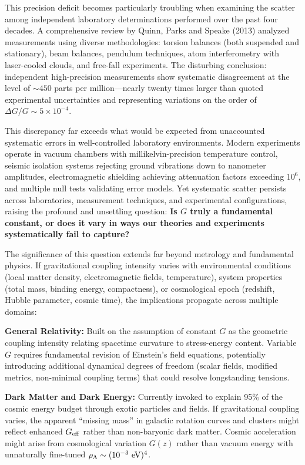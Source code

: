 \documentclass[11pt,a4paper]{article}
\begin{document}
This precision deficit becomes particularly troubling when examining the
scatter among independent laboratory determinations performed over the
past four decades. A comprehensive review by Quinn, Parks and Speake
(2013) analyzed measurements using diverse methodologies: torsion
balances (both suspended and stationary), beam balances, pendulum
techniques, atom interferometry with laser-cooled clouds, and free-fall
experiments. The disturbing conclusion: independent high-precision
measurements show systematic disagreement at the level of \(\sim 450\)
parts per million---nearly twenty times larger than quoted experimental
uncertainties and representing variations on the order of
\(\Delta G/G \sim 5 \times 10^{-4}\).

This discrepancy far exceeds what would be expected from unaccounted
systematic errors in well-controlled laboratory environments. Modern
experiments operate in vacuum chambers with millikelvin-precision
temperature control, seismic isolation systems rejecting ground
vibrations down to nanometer amplitudes, electromagnetic shielding
achieving attenuation factors exceeding \(10^6\), and multiple null
tests validating error models. Yet systematic scatter persists across
laboratories, measurement techniques, and experimental configurations,
raising the profound and unsettling question: \textbf{Is \(G\) truly a
fundamental constant, or does it vary in ways our theories and
experiments systematically fail to capture?}

The significance of this question extends far beyond metrology and
fundamental physics. If gravitational coupling intensity varies with
environmental conditions (local matter density, electromagnetic fields,
temperature), system properties (total mass, binding energy,
compactness), or cosmological epoch (redshift, Hubble parameter, cosmic
time), the implications propagate across multiple domains:

\textbf{General Relativity:} Built on the assumption of constant \(G\)
as the geometric coupling intensity relating spacetime curvature to
stress-energy content. Variable \(G\) requires fundamental revision of
Einstein's field equations, potentially introducing additional dynamical
degrees of freedom (scalar fields, modified metrics, non-minimal
coupling terms) that could resolve longstanding tensions.

\textbf{Dark Matter and Dark Energy:} Currently invoked to explain 95\%
of the cosmic energy budget through exotic particles and fields. If
gravitational coupling varies, the apparent ``missing mass'' in galactic
rotation curves and clusters might reflect enhanced \(G_{\rm eff}\)
rather than non-baryonic dark matter. Cosmic acceleration might arise
from cosmological variation \(G(z)\) rather than vacuum energy with
unnaturally fine-tuned \(\rho_\Lambda \sim (10^{-3}~{\rm eV})^4\).
\end{document}
